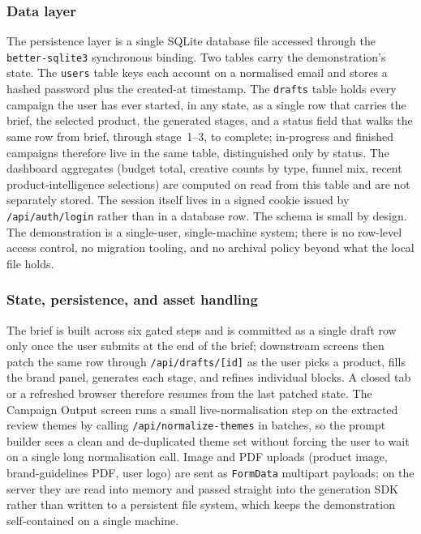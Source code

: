 \documentclass[12pt,a4paper]{report}
\begin{document}
\subsubsection{Data layer}
\label{sec:webdata}

The persistence layer is a single SQLite database file accessed through the \texttt{better-sqlite3} synchronous binding. Two tables carry the demonstration's state. The \texttt{users} table keys each account on a normalised email and stores a hashed password plus the created-at timestamp. The \texttt{drafts} table holds every campaign the user has ever started, in any state, as a single row that carries the brief, the selected product, the generated stages, and a status field that walks the same row from brief, through stage~1--3, to complete; in-progress and finished campaigns therefore live in the same table, distinguished only by status. The dashboard aggregates (budget total, creative counts by type, funnel mix, recent product-intelligence selections) are computed on read from this table and are not separately stored. The session itself lives in a signed cookie issued by \texttt{/api/auth/login} rather than in a database row. The schema is small by design. The demonstration is a single-user, single-machine system; there is no row-level access control, no migration tooling, and no archival policy beyond what the local file holds.

\subsubsection{State, persistence, and asset handling}
\label{sec:webstate}

The brief is built across six gated steps and is committed as a single draft row only once the user submits at the end of the brief; downstream screens then patch the same row through \texttt{/api/drafts/[id]} as the user picks a product, fills the brand panel, generates each stage, and refines individual blocks. A closed tab or a refreshed browser therefore resumes from the last patched state. The Campaign Output screen runs a small live-normalisation step on the extracted review themes by calling \texttt{/api/normalize-themes} in batches, so the prompt builder sees a clean and de-duplicated theme set without forcing the user to wait on a single long normalisation call. Image and PDF uploads (product image, brand-guidelines PDF, user logo) are sent as \texttt{FormData} multipart payloads; on the server they are read into memory and passed straight into the generation SDK rather than written to a persistent file system, which keeps the demonstration self-contained on a single machine.
\end{document}
